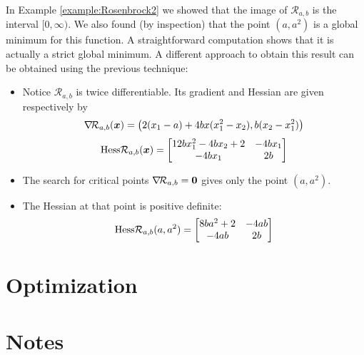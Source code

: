 
\begin{example}
In Example \ref{example:Rosenbrock2} we showed that the image of $\mathcal{R}_{a,b}$ is the interval $[0,\infty)$.  We also found (by inspection) that the point $(a,a^2)$ is a global minimum for this function. A straightforward computation shows that it is actually a strict global minimum.  A different approach to obtain this result can be obtained using the previous technique:
\begin{itemize}
	\item Notice $\mathcal{R}_{a,b}$ is twice differentiable.  Its gradient and Hessian are given respectively by
	\begin{equation*}
	\mathop{\nabla\! {\mathcal{R}_{a,b}}}(\boldsymbol{x}) = \big( 2(x_1-a) +4bx(x_1^2-x_2) , b(x_2-x_1^2) \big) \\
	\end{equation*}
	\begin{equation*}
	\mathop{\mathrm{Hess}{\mathcal{R}_{a,b}}}(\boldsymbol{x}) = \begin{bmatrix}
	12bx_1^2-4bx_2+2 & -4bx_1 \\
	-4bx_1 & 2b
	\end{bmatrix}
	\end{equation*}
	\item The search for critical points $\mathop{\nabla\! {\mathcal{R}_{a,b}}} = \boldsymbol{0}$ gives only the point $(a,a^2)$.
	\item The Hessian at that point is positive definite:
	\begin{equation*}
	\mathop{\mathrm{Hess}{\mathcal{R}_{a,b}}}(a,a^2) = \begin{bmatrix}
	8ba^2+2 & -4ab \\
	-4ab & 2b
	\end{bmatrix}
	\end{equation*}
\end{itemize}
\end{example}

\section{Optimization}



\section*{Notes}
	